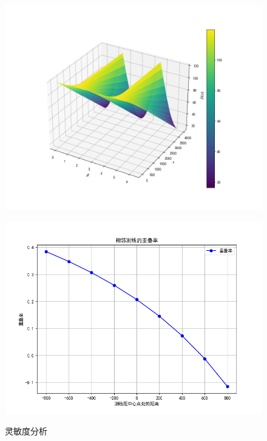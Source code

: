 \documentclass[withoutpreface,bwprint]{cumcmthesis} %
\begin{document}
    \begin{figure}[htbp]
        \centering
        \begin{minipage}[c]{0.48\textwidth}
            \centering
            \includegraphics[height=0.3\textheight]{第二问3.png}
            \label{20}
        \end{minipage}
        \begin{minipage}[c]{0.48\textwidth}
            \centering
            \includegraphics[height=0.26\textheight]{myplot2.png}
            \label{34}
        \end{minipage}
        \caption{灵敏度分析}
    \end{figure}
    
\end{document}
